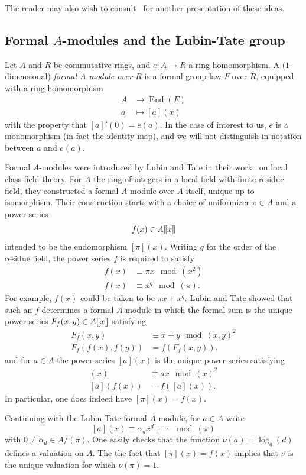 \documentclass{amsart}
\theoremstyle{definition}
\theoremstyle{remark}
\newcommand{\LL}{[\mkern-2mu[}
\newcommand{\RR}{]\mkern-2mu]}
\DeclareMathOperator{\Endo}{End}
\newcommand{\ltgroup}{F_{f}}
\begin{document}
The reader may also wish to consult~\cite{MR3050712} for another
presentation of these ideas.

\subsection{Formal $A$-modules and the Lubin-Tate group}
\label{sec:formal-a-modules} 

Let $A$ and $R$ be commutative rings, and $e:A\to R$ a ring
homomorphism.   A ($1$-dimensional) {\em formal $A$-module over $R$}
is a formal group law $F$ over $R$, equipped with a ring homomorphism
\begin{align*}
A &\to \Endo(F) \\
a &\mapsto [a](x)
\end{align*}
with the property that $[a]'(0)=e(a)$.  In the case of interest to us,
$e$ is a monomorphism (in fact the identity map), and we will not
distinguish in notation between $a$ and $e(a)$.

Formal $A$-modules were introduced by Lubin and Tate in their
work~\cite{LT} on local class field theory.  For $A$ the ring of
integers in a local field with finite residue field, they constructed
a formal $A$-module over $A$ itself, unique up to isomorphism.  Their
construction starts with a choice of uniformizer $\pi\in A$ and a
power series
\[
f(x) \in A\LL x\RR
\]
intended to be the endomorphism $[\pi](x)$.  Writing $q$ for the order
of the residue field, the power series $f$ is required to satisfy
\begin{align*}
f(x) &\equiv \pi x \mod (x^{2}) \\
f(x) &\equiv x^{q} \mod (\pi).
\end{align*}
For example, $f(x)$ could be taken to be $\pi x+ x^{q}$.
Lubin and Tate showed that such an $f$ determines a formal $A$-module
in which the formal sum is the unique power series $\ltgroup(x,y)\in A\LL x\RR$
satisfying
\begin{align*}
\ltgroup(x,y) &\equiv x + y \mod (x,y)^{2} \\
\ltgroup(f(x),f(y)) &= f(\ltgroup(x,y)), 
\end{align*}
and for $a\in A$ the power series $[a](x)$ is the unique power series
satisfying
\begin{align*}
[a](x) &\equiv a x \mod (x)^{2} \\
[a](f(x)) &= f([a](x)).
\end{align*}
In particular, one does indeed have $[\pi](x)=f(x)$.

Continuing with the Lubin-Tate formal $A$-module, for $a\in A$ write
\[
[a](x) \equiv \alpha_{d}x^{d} + \cdots \mod (\pi)
\]
with $0\ne \alpha_{d}\in A/(\pi)$.  One easily checks that the
function $\nu(a)=\log_{q}(d)$ defines a valuation on $A$.  The the
fact that $[\pi](x)=f(x)$ implies that $\nu$ is the unique valuation
for which $\nu(\pi)=1$.
\end{document}
